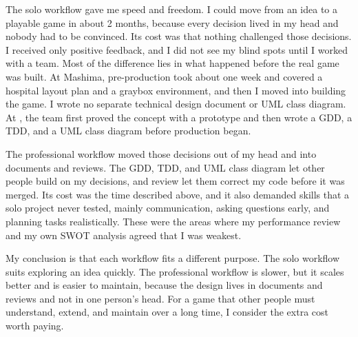 The solo workflow gave me speed and freedom. I could move from an idea to a playable game in about 2 months, because every decision lived in my head and nobody had to be convinced. Its cost was that nothing challenged those decisions. I received only positive feedback, and I did not see my blind spots until I worked with a team. Most of the difference lies in what happened before the real game was built. At Mashima, pre-production took about one week and covered a hospital layout plan and a graybox environment, and then I moved into building the game. I wrote no separate technical design document or UML class diagram. At \companyName{}, the team first proved the concept with a prototype and then wrote a GDD, a TDD, and a UML class diagram before production began.

The professional workflow moved those decisions out of my head and into documents and reviews. The GDD, TDD, and UML class diagram let other people build on my decisions, and review let them correct my code before it was merged. Its cost was the time described above, and it also demanded skills that a solo project never tested, mainly communication, asking questions early, and planning tasks realistically. These were the areas where my performance review and my own SWOT analysis agreed that I was weakest.

My conclusion is that each workflow fits a different purpose. The solo workflow suits exploring an idea quickly. The professional workflow is slower, but it scales better and is easier to maintain, because the design lives in documents and reviews and not in one person's head. For a game that other people must understand, extend, and maintain over a long time, I consider the extra cost worth paying.